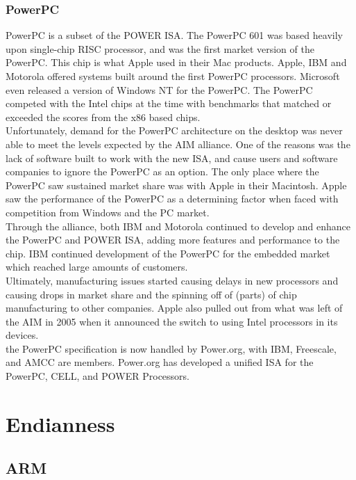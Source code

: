 \documentclass[letterpaper,10pt,titlepage]{article}
\begin{document}
\subsubsection{PowerPC}

PowerPC is a subset of the POWER ISA\cite{Power.org}. The PowerPC 601 was based heavily upon single-chip RISC processor, and was the first market version of the PowerPC. This chip is what Apple used in their Mac products. Apple, IBM and Motorola offered systems built around the first PowerPC processors. Microsoft even released a version of Windows NT for the PowerPC. The PowerPC competed with the Intel chips at the time with benchmarks that matched or exceeded the scores from the x86 based chips.\\

Unfortunately, demand for the PowerPC architecture on the desktop was never able to meet the levels expected by the AIM alliance. One of the reasons was the lack of software built to work with the new ISA, and cause users and software companies to ignore the PowerPC as an option. The only place where the PowerPC saw sustained market share was with Apple in their Macintosh. Apple saw the performance of the PowerPC as a determining factor when faced with competition from Windows and the PC market.\\

Through the alliance, both IBM and Motorola continued to develop and enhance the PowerPC and POWER ISA, adding more features and performance to the chip. IBM continued development of the PowerPC for the embedded market which reached large amounts of customers. \\

Ultimately, manufacturing issues started causing delays in new processors and causing drops in market share and the spinning off of (parts) of chip manufacturing to other companies. Apple also pulled out from what was left of the AIM in 2005 when it announced the switch to using Intel processors in its devices.\\

the PowerPC specification is now handled by Power.org, with IBM, Freescale, and AMCC are members. Power.org has developed a unified ISA for the PowerPC, CELL, and POWER Processors.

\section{Endianness}
\subsection{ARM}
\end{document}
